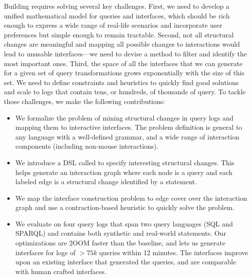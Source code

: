 Building \sys requires solving several key challenges.  First, we need to develop a unified mathematical model for queries and interfaces, which should be rich enough to express a wide range of real-life scenarios and incorporate user preferences but simple enough to remain tractable. Second, not all structural changes are meaningful and mapping all possible changes to interactions would lead to unusable interfaces---we need to devise a method to filter and identify the most important ones. Third, the space of all the interfaces that we can generate for a given set of query transformations grows exponentially with the size of this set. We need to define constraints and heuristics to quickly find good solutions and scale to logs that contain tens, or hundreds, of thousands of query. To tackle those challenges, we make the following contributions:
\begin{itemize}[leftmargin=*, topsep=0mm, itemsep=0mm]
\item We formalize the problem of mining structural changes in query logs and mapping them to interactive interfaces.  The problem definition is general to any language with a well-defined grammar, and a wide range of interaction components (including non-mouse interactions).
\item We introduce a DSL called \lang to specify interesting structural changes. This helps generate an interaction graph where each node is a query and each labeled edge is a structural change identified by a \lang statement.
\item We map the interface construction problem to edge cover over the interaction graph and use a contraction-based heuristic to quickly solve the problem.
\item We evaluate \sys{} on four query logs that span two query languages (SQL and SPARQL) and contains both synthetic and real-world statements. Our optimizations are 2OOM faster than the baseline, and lets us generate interfaces for logs of $>75k$ queries within 12 minutes.  The interfaces improve upon an existing interface that generated the queries, and are comparable with human crafted interfaces.

\end{itemize}


